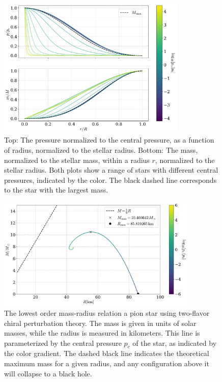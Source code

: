 \begin{figure}[!h]
    \centering
    \includegraphics[width=0.8\textwidth]{../scripts/figurer/pion_star/pressure_mass_pion_star.pdf}
    \caption{
    Top: The pressure normalized to the central pressure, as a function of radius, normalized to the stellar radius.
    Bottom: The mass, normalized to the stellar mass, within a radius $r$, normalized to the stellar radius.
    Both plots show a range of stars with different central pressures, indicated by the color.
    The black dashed line corresponds to the star with the largest mass.
    }
    \label{fig: pressure and mass for pion star}
\end{figure}

\begin{figure}[!h]
    \centering
    \includegraphics[width=0.85\textwidth]{../scripts/figurer/pion_star/mass_radius_pion_star.pdf}
    \caption{
        The lowest order mass-radius relation a pion star using two-flavor chiral perturbation theory.
        The mass is given in units of solar masses, while the radius is measured in kilometers.
        This line is parameterized by the central pressure $p_c$ of the star, as indicated by the color gradient.
        The dashed black line indicates the theoretical maximum mass for a given radius, and any configuration above it will collapse to a black hole.
        }
        \label{fig: mass-radius relation pion star}
\end{figure}


